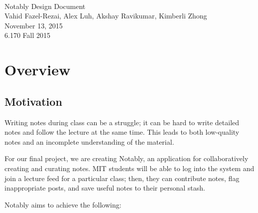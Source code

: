 \documentclass{article}
\begin{document}
\newcommand{\class}{Notably Design Document}
\newcommand{\duedate}{November 13, 2015}
\newcommand{\classsection}{6.170 Fall 2015}
\newcommand{\authors}{Vahid Fazel-Rezai, Alex Luh, Akshay Ravikumar, Kimberli Zhong}


\begin{center}
~\\[1cm] 
{\huge \class} \\[0.4cm] 
{\large \authors} \\[0.2cm]
{\large \duedate} \\[0.2cm]
{\large \classsection}
\end{center}

\section*{Overview}
\subsection*{Motivation}
Writing notes during class can be a struggle; it can be hard to write detailed notes and follow the lecture at the same time. This leads to both low-quality notes and an incomplete understanding of the material.

For our final project, we are creating Notably, an application for collaboratively creating and curating notes. MIT students will be able to log into the system and join a lecture feed for a particular class; then, they can contribute notes, flag inappropriate posts, and save useful notes to their personal stash. 

Notably aims to achieve the following:
\end{document}
